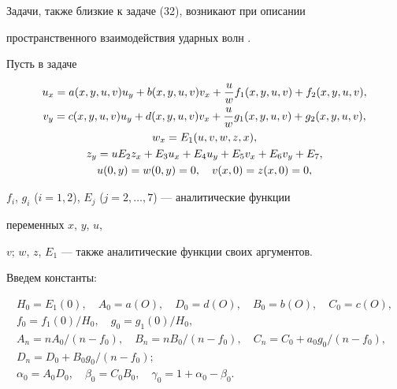Задачи, также близкие к задаче (32), возникают при описании


пространственного взаимодействия ударных волн \cite{8}.





Пусть в задаче


\begin{gather}


u_x=a(x,y,u,v)u_y+b(x,y,u,v)v_x+\frac{u}{w}f_1(x,y,u,v)+


f_2(x,y,u,v),\notag\\


v_y=c(x,y,u,v)u_y+d(x,y,u,v)v_x+\frac{u}{w}g_1(x,y,u,v)+g_2(x,y,u,v),


\notag\\


w_x=E_1(u,v,w,z,x),\\


z_y=uE_2z_x+E_3u_x+E_4u_y+E_5v_x+E_6v_y+E_7,\notag\\


u(0,y)=w(0,y)=0,\quad v(x,0)=z(x,0)=0,\notag


\end{gather}


$f_i$, $g_i$ ($i=1,2$), $E_j$ ($j=2,\dotsc,7$) --- аналитические функции


переменных $x$, $y$, $u$,


$v$; $w$, $z$, $E_1$ --- также аналитические функции своих аргументов.


Введем константы:


\begin{gather*}


H_0=E_1(0),\quad A_0=a(O),\quad D_0=d(O),\quad B_0=b(O),\quad C_0=c(O),\\


f_0=f_1(0)/H_0,\quad g_0=g_1(0)/H_0,\\


A_n=nA_0/(n-f_0),\quad B_n=nB_0/(n-f_0),\quad


C_n=C_0+a_0g_0/(n-f_0),\\


D_n=D_0+B_0g_0/(n-f_0);\\


\alpha_0=A_0D_0,\quad \beta_0=C_0B_0,\quad


\gamma_0=1+\alpha_0-\beta_0.


\end{gather*}





